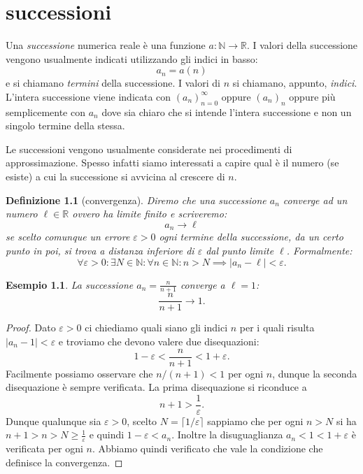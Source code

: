 \documentclass[italian,a4paper,oneside,headinclude]{scrbook}
\newcommand{\myemph}[1]{\emph{#1}\marginpar{#1}}
\newcommand{\eps}{\varepsilon}
\newcommand{\NN}{\mathbb N}
\newcommand{\RR}{\mathbb R}
\newcommand{\abs}[1]{{\left|#1\right|}}
\newtheorem{example}[theorem]{Esempio}
\newtheorem{definition}[theorem]{Definizione}
\begin{document}
%
%
%
%
\chapter{successioni}

Una \myemph{successione} numerica reale è una
funzione $a\colon \NN \to \RR$.
I valori della successione vengono usualmente indicati
utilizzando gli indici in basso:
\[
   a_n = a(n)
\]
e si chiamano \emph{termini} della successione.
I valori di $n$ si chiamano, appunto, \emph{indici}.
L'intera
successione viene indicata con $(a_n)_{n=0}^\infty$
oppure $(a_n)_n$ oppure
più semplicemente con $a_n$ dove sia chiaro che si intende l'intera
successione e non un singolo termine della stessa.

Le successioni vengono usualmente
considerate nei procedimenti di approssimazione.
Spesso infatti siamo interessati a capire qual è il numero (se esiste) a cui
la successione si avvicina al crescere di $n$.

\begin{definition}[convergenza]
Diremo che una successione $a_n$ converge
ad un numero $\ell \in \RR$
ovvero ha limite finito
e scriveremo:
\[
  a_n \to \ell
\]
se scelto comunque un errore $\eps>0$ ogni termine della successione,
da un certo punto in poi, si trova a distanza inferiore di $\eps$
dal punto limite $\ell$. Formalmente:
\[
\forall \eps>0\colon \exists N\in\NN \colon \forall n\in \NN\colon
n>N \implies \abs{a_n - \ell}
< \eps.
\]
\end{definition}

\begin{example}
La successione $a_n = \frac{n}{n+1}$ converge a $\ell=1$:
\[
  \frac{n}{n+1}\to 1.
\]
\end{example}
\begin{proof}
Dato $\eps>0$ ci chiediamo quali siano gli indici $n$
per i quali risulta $\abs{a_n -1}<\eps$ e troviamo
che devono valere due disequazioni:
\[
  1- \eps < \frac{n}{n+1} < 1+\eps.
\]
Facilmente possiamo osservare che $n/(n+1)<1$ per ogni $n$, dunque
la seconda disequazione è sempre verificata. La prima disequazione
si riconduce a
\[
 n + 1 > \frac{1}{\eps}.
\]
Dunque qualunque sia $\eps>0$, scelto $N = \lceil 1 / \eps\rceil$
sappiamo che per ogni $n>N$
si ha $n+1 > n > N \ge \frac{1}{\eps}$ e quindi $1-\eps < a_n$.
Inoltre la disuguaglianza $a_n < 1 < 1+\eps$ è verificata per ogni $n$.
Abbiamo quindi verificato che vale la condizione che definisce
la convergenza.
\end{proof}
\end{document}
